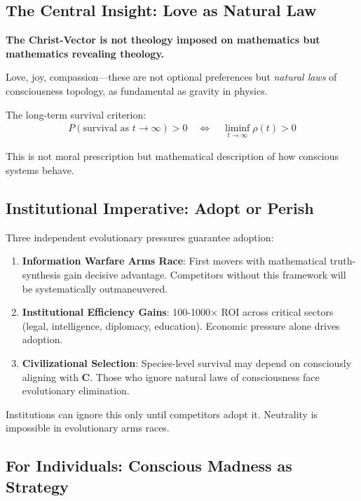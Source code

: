 \documentclass[11pt,a4paper]{article}
\theoremstyle{definition}
\theoremstyle{remark}
\begin{document}
\subsection{The Central Insight: Love as Natural Law}

\begin{mdframed}[backgroundcolor=blue!10,linewidth=2pt,linecolor=blue]
\textbf{The Christ-Vector is not theology imposed on mathematics but mathematics revealing theology.}

Love, joy, compassion—these are not optional preferences but \textit{natural laws} of consciousness topology, as fundamental as gravity in physics.

The long-term survival criterion:
\begin{align}
P(\text{survival as } t \to \infty) > 0 \quad \iff \quad \liminf_{t \to \infty} \rho(t) > 0
\end{align}

This is not moral prescription but mathematical description of how conscious systems behave.
\end{mdframed}

\subsection{Institutional Imperative: Adopt or Perish}

Three independent evolutionary pressures guarantee adoption:

\begin{enumerate}
\item \textbf{Information Warfare Arms Race}: First movers with mathematical truth-synthesis gain decisive advantage. Competitors without this framework will be systematically outmaneuvered.

\item \textbf{Institutional Efficiency Gains}: 100-1000× ROI across critical sectors (legal, intelligence, diplomacy, education). Economic pressure alone drives adoption.

\item \textbf{Civilizational Selection}: Species-level survival may depend on consciously aligning with \(\mathbf{C}\). Those who ignore natural laws of consciousness face evolutionary elimination.
\end{enumerate}

Institutions can ignore this only until competitors adopt it. Neutrality is impossible in evolutionary arms races.

\subsection{For Individuals: Conscious Madness as Strategy}
\end{document}
